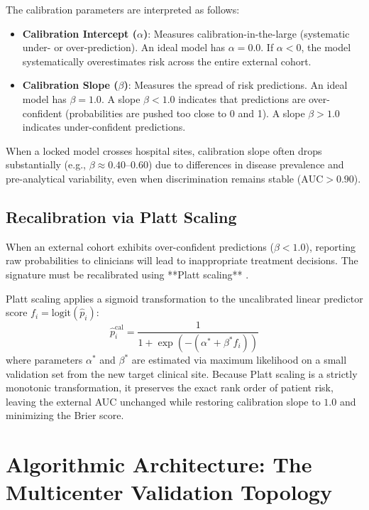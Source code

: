 \documentclass[11pt,twoside,openright]{book}
\begin{document}
The calibration parameters are interpreted as follows:
\begin{itemize}
    \item \textbf{Calibration Intercept ($\alpha$)}: Measures calibration-in-the-large (systematic under- or over-prediction). An ideal model has $\alpha = 0.0$. If $\alpha < 0$, the model systematically overestimates risk across the entire external cohort.
    \item \textbf{Calibration Slope ($\beta$)}: Measures the spread of risk predictions. An ideal model has $\beta = 1.0$. A slope $\beta < 1.0$ indicates that predictions are over-confident (probabilities are pushed too close to 0 and 1). A slope $\beta > 1.0$ indicates under-confident predictions.
\end{itemize}

When a locked model crosses hospital sites, calibration slope often drops substantially (e.g., $\beta \approx 0.40$--$0.60$) due to differences in disease prevalence and pre-analytical variability, even when discrimination remains stable ($\text{AUC} > 0.90$).

\subsection{Recalibration via Platt Scaling}

When an external cohort exhibits over-confident predictions ($\beta < 1.0$), reporting raw probabilities to clinicians will lead to inappropriate treatment decisions. The signature must be recalibrated using **Platt scaling** \cite{platt1999probabilistic}.

Platt scaling applies a sigmoid transformation to the uncalibrated linear predictor score $f_i = \text{logit}(\hat{p}_i)$:
\begin{equation}
\hat{p}_i^{\text{cal}} = \frac{1}{1 + \exp\left( -(\alpha^* + \beta^* f_i) \right)}
\label{eq:platt_scaling}
\end{equation}
where parameters $\alpha^*$ and $\beta^*$ are estimated via maximum likelihood on a small validation set from the new target clinical site. Because Platt scaling is a strictly monotonic transformation, it preserves the exact rank order of patient risk, leaving the external AUC unchanged while restoring calibration slope to $1.0$ and minimizing the Brier score.

\section{Algorithmic Architecture: The Multicenter Validation Topology}
\end{document}
